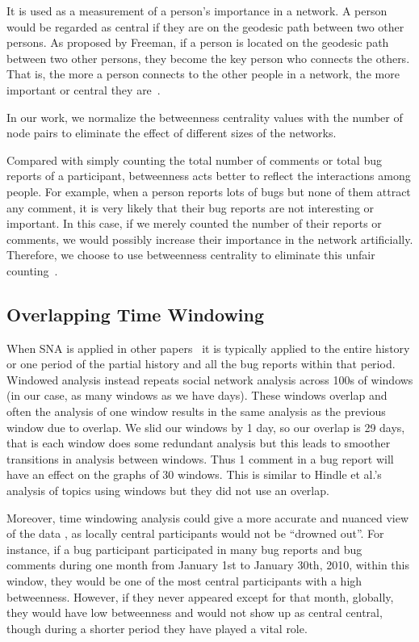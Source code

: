 \documentclass[10pt, conference, compsocconf]{IEEEtran}
\begin{document}
It is used as a measurement of a person's importance in a network. 
A person would be regarded as central if they are on the geodesic path
between two other persons. 
As proposed by Freeman, if a person is located
on the geodesic path between two other persons, they become the key
person who connects the others. 
That is, the more a person connects to
the other people in a network, the more important or central they 
are~\cite{BOOK:han}.


In our work, we normalize the betweenness centrality values with the
number of node pairs to eliminate the effect of different sizes of the
networks.


Compared with simply counting the total number of comments or total
bug reports of a participant, betweenness acts better to reflect the
interactions among people. For example, when a person reports lots of
bugs but none of them attract any comment, it is very likely that
their bug reports are not interesting or important. In this case, if
we merely counted the number of their reports or comments, we would
possibly increase their importance in the network
artificially. Therefore, we choose to use betweenness centrality to
eliminate this unfair counting~\cite{ICSEsocio:la}.


\subsection{Overlapping Time Windowing}

When SNA is applied in other
papers~\cite{MSR:christ,ICSEsocio:meneely} it is typically applied to
the entire history or one period of the partial history and all the
bug reports within that period.
Windowed analysis instead repeats social network analysis across 100s
of windows (in our case, as many windows as we have days). These
windows overlap and often the analysis of one window results in the
same analysis as the previous window due to overlap. We slid our
windows by 1 day, so our overlap is 29 days, that is each window does
some redundant analysis but this leads to smoother transitions in
analysis between windows. Thus 1 comment in a bug report will have an
effect on the graphs of 30 windows. This is similar to Hindle et
al.'s\cite{ICSMwindowed:hindle} analysis of topics using windows but
they did not use an overlap.

Moreover, time windowing analysis could give a more accurate and
nuanced view of the data \cite{ICSEsocio:meneely}
\cite{ICSMwindowed:hindle}, as locally central participants would not
be ``drowned out''. For instance, if a
bug participant participated in many bug reports and bug comments during one
month from January 1st to January 30th, 2010, within this window, they
would be one of the most central participants with a high
betweenness. However, if they never appeared except for that
month, globally, they would have low betweenness and would not show up
as central
central, though during a shorter period they have played a vital role. 
\end{document}

